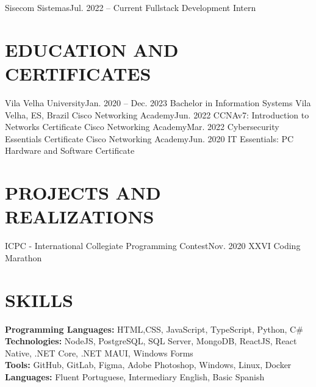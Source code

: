 \resumeSubheading
{Sisecom Sistemas}{Jul. 2022 -- Current}
{Fullstack Development Intern}{}
\resumeItemListStart
{}
\resumeItemListEnd

\resumeSubHeadingListEnd

\section {EDUCATION AND CERTIFICATES}
\resumeSubHeadingListStart
\resumeSubheading
{Vila Velha University}{Jan. 2020 -- Dec. 2023}
{Bachelor in Information Systems}
{Vila Velha, ES, Brazil}
\resumeSubHeadingListEnd
\resumeSubHeadingListStart
\resumeSubheading
{Cisco Networking Academy}{Jun. 2022}
{CCNAv7: Introduction to Networks Certificate}{}
\resumeSubheading
{Cisco Networking Academy}{Mar. 2022}
{Cybersecurity Essentials Certificate}{}
\resumeSubheading
{Cisco Networking Academy}{Jun. 2020}
{IT Essentials: PC Hardware and Software Certificate}{}
\resumeSubHeadingListEnd

\section{PROJECTS AND REALIZATIONS}
\resumeSubHeadingListStart
\resumeSubheading
{ICPC - International Collegiate Programming Contest}{Nov. 2020}
{XXVI Coding Marathon}{}
          
\resumeSubHeadingListEnd

\section{SKILLS}
\begin{itemize}[leftmargin=0in, label={}]
	\small{\item{
		\textbf{Programming Languages:}
		{HTML,CSS, JavaScript, TypeScript, Python, C\#}
		\vspace{2pt} \\

    \textbf{Technologies:}
		{NodeJS, PostgreSQL, SQL Server, MongoDB, ReactJS, React Native, .NET Core, .NET MAUI, Windows Forms}
		\vspace{2pt} \\
		     
		\textbf{Tools:}
		{GitHub, GitLab, Figma, Adobe Photoshop, Windows, Linux, Docker}
		\vspace{2pt} \\
		     
		\textbf{Languages:}
		{Fluent Portuguese, Intermediary English, Basic Spanish}
	}}
\end{itemize}
